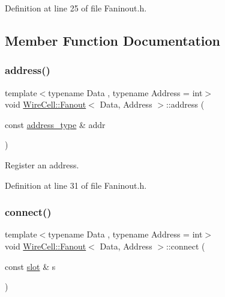 Definition at line 25 of file Faninout.\+h.



\subsection{Member Function Documentation}
\mbox{\label{class_wire_cell_1_1_fanout_ae47d24683d1dfb632e8e70397344e6da}} 
\subsubsection{\texorpdfstring{address()}{address()}}
{\footnotesize\ttfamily template$<$typename Data , typename Address  = int$>$ \\
void \hyperlink{class_wire_cell_1_1_fanout}{Wire\+Cell\+::\+Fanout}$<$ Data, Address $>$\+::address (\begin{DoxyParamCaption}\item[{const \hyperlink{class_wire_cell_1_1_fanout_ab1b06d1a80be80055b2e76ca512294c5}{address\+\_\+type} \&}]{addr }\end{DoxyParamCaption})\hspace{0.3cm}{\ttfamily [inline]}}



Register an address. 



Definition at line 31 of file Faninout.\+h.

\mbox{\label{class_wire_cell_1_1_fanout_a9dda7047d121f8054792658dc6aba664}} 
\subsubsection{\texorpdfstring{connect()}{connect()}}
{\footnotesize\ttfamily template$<$typename Data , typename Address  = int$>$ \\
void \hyperlink{class_wire_cell_1_1_fanout}{Wire\+Cell\+::\+Fanout}$<$ Data, Address $>$\+::connect (\begin{DoxyParamCaption}\item[{const \hyperlink{class_wire_cell_1_1_fanout_aad9b77d911095ea21e611a806ee42d00}{slot} \&}]{s }\end{DoxyParamCaption})\hspace{0.3cm}{\ttfamily [inline]}}




